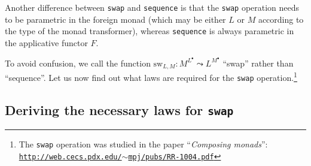 Another difference between \lstinline!swap! and \lstinline!sequence!
is that the \texttt{}\lstinline!swap! operation needs to be parametric
in the foreign monad (which may be either $L$ or $M$ according to
the type of the monad transformer), whereas \lstinline!sequence!
is always parametric in the applicative functor $F$. %
\begin{comment}
\emph{This is actually confusing! Let\textsf{'}s not do this and always write
$\text{sw}_{L}^{M}:M^{L^{A}}\rightarrow L^{M^{A}}$}

To denote more clearly the monad with respect to which \lstinline!swap!
is parametric, we may write
\begin{align*}
\text{sw}_{L}^{M}:L^{M^{A}}\rightarrow M^{L^{A}}\quad & \text{for the composed-inside transformers,}\\
\text{sw}_{L}^{M}:M^{L^{A}}\rightarrow L^{M^{A}}\quad & \text{for the composed-outside transformers.}
\end{align*}
The superscript $M$ in $\text{sw}_{L}^{M}$ shows that $M$ is a
\emph{type parameter} in \lstinline!swap!; that is, \lstinline!swap!
is parametric in the monad $M$. The subscript $L$ in $\text{sw}_{L}^{M}$
shows that the implementations of \lstinline!swap! may need to use
completely different code for different monads $L$.
\end{comment}

To avoid confusion, we call the function $\text{sw}_{L,M}:M^{L^{\bullet}}\leadsto L^{M^{\bullet}}$
\textsf{``}swap\textsf{''} rather than \textsf{``}sequence\textsf{''}. Let us now find out what laws
are required for the \texttt{}\lstinline!swap! operation.\footnote{The \lstinline!swap! operation was studied in the paper \textsf{``}\emph{Composing
monads}\textsf{''}: \texttt{\href{http://web.cecs.pdx.edu/~mpj/pubs/RR-1004.pdf}{http://web.cecs.pdx.edu/$\sim$mpj/pubs/RR-1004.pdf}}}

\subsection{Deriving the necessary laws for \texttt{swap}}

